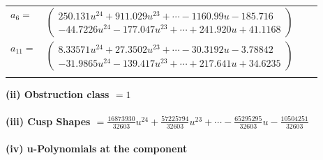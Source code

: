 \documentclass[1p]{elsarticle_modified}
\theoremstyle{definition}
\begin{document}
\begin{tabular}{m{7pt} m{180pt} m{7pt} m{180pt} }
\flushright $a_{6}=$&$\begin{pmatrix}250.131 u^{24}+911.029 u^{23}+\cdots-1160.99 u-185.716\\-44.7226 u^{24}-177.047 u^{23}+\cdots+241.920 u+41.1168\end{pmatrix}$ \\
\flushright $a_{11}=$&$\begin{pmatrix}8.33571 u^{24}+27.3502 u^{23}+\cdots-30.3192 u-3.78842\\-31.9865 u^{24}-139.417 u^{23}+\cdots+217.641 u+34.6235\end{pmatrix}$\\&\end{tabular}
\flushleft \textbf{(ii) Obstruction class $= 1$}\\~\\
\flushleft \textbf{(iii) Cusp Shapes $= \frac{16873930}{32603} u^{24}+\frac{57225794}{32603} u^{23}+\cdots-\frac{65295295}{32603} u-\frac{10504251}{32603}$}\\~\\
\newpage\renewcommand{\arraystretch}{1}
\flushleft \textbf{(iv) u-Polynomials at the component}\newline \\
\end{document}
